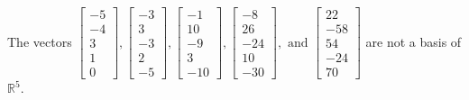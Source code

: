 \begin{exercise}
\begin{exerciseStatement}
  \end{exerciseStatement}
  \begin{exerciseAnswer}
   The vectors \(\left[\begin{array}{r}
-5 \\
-4 \\
3 \\
1 \\
0
\end{array}\right] , \left[\begin{array}{r}
-3 \\
3 \\
-3 \\
2 \\
-5
\end{array}\right] , \left[\begin{array}{r}
-1 \\
10 \\
-9 \\
3 \\
-10
\end{array}\right] , \left[\begin{array}{r}
-8 \\
26 \\
-24 \\
10 \\
-30
\end{array}\right] , \text{ and } \left[\begin{array}{r}
22 \\
-58 \\
54 \\
-24 \\
70
\end{array}\right]\) 
  	 are not  a basis of \(\mathbb{R}^5\).
  


  \end{exerciseAnswer}
\end{exercise}